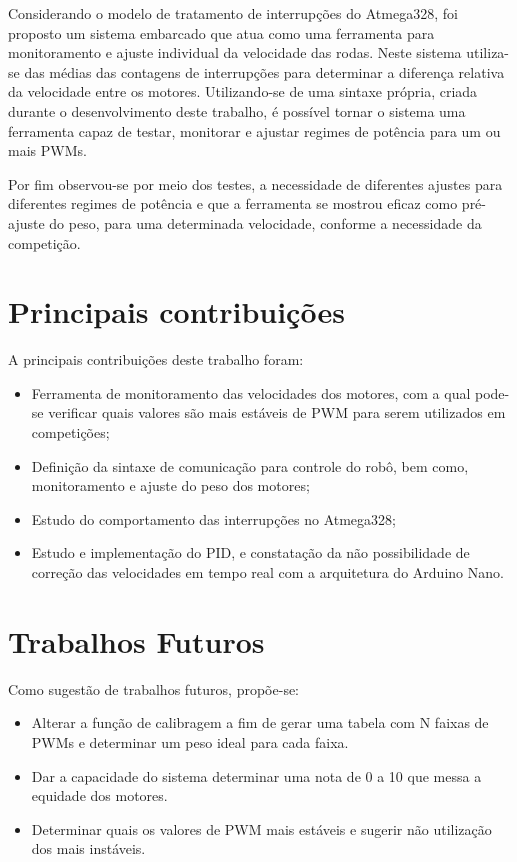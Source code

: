 \documentclass[a4paper,12pt,portuguese]{ufms-cpcx}
\begin{document}
Considerando o modelo de tratamento de interrupções do Atmega328, foi proposto um sistema embarcado que atua como uma ferramenta para monitoramento e ajuste individual da velocidade das rodas. 
%
Neste sistema utiliza-se das médias das contagens de interrupções para determinar a diferença relativa da velocidade entre os motores. 
Utilizando-se de uma sintaxe própria, criada durante o desenvolvimento deste trabalho, é possível tornar o sistema uma ferramenta capaz de testar, monitorar e ajustar regimes de potência para um ou mais PWMs.

Por fim observou-se por meio dos testes, a necessidade de diferentes ajustes para diferentes regimes de potência e que a ferramenta se mostrou eficaz como pré-ajuste do peso, para uma determinada velocidade, conforme a necessidade da competição.


\section*{Principais contribuições}
A principais contribuições deste trabalho foram:
\begin{itemize}
	\item Ferramenta de monitoramento das velocidades dos motores, com a qual pode-se verificar quais valores são mais estáveis de PWM para serem utilizados em competições;
	\item Definição da sintaxe de comunicação para controle do robô, bem como, monitoramento e ajuste do peso dos motores;
	\item Estudo do comportamento das interrupções no Atmega328;
	\item Estudo e implementação do PID, e constatação da não possibilidade de correção das velocidades em tempo real com a arquitetura do Arduino Nano.
\end{itemize}


\section*{Trabalhos Futuros}
Como sugestão de trabalhos futuros, propõe-se:
\begin{itemize}
	\item Alterar a função de calibragem a fim de gerar uma tabela com N faixas de PWMs e determinar um peso ideal para cada faixa.
	\item Dar a capacidade do sistema determinar uma nota de 0 a 10 que messa a equidade dos motores.
	\item Determinar quais os valores de PWM mais estáveis e sugerir não utilização dos mais instáveis.
\end{itemize}
\end{document}
